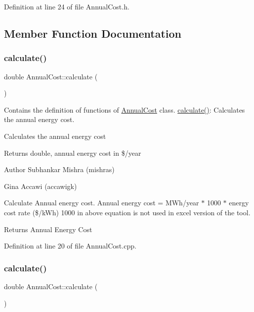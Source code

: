 Definition at line 24 of file Annual\+Cost.\+h.



\subsection{Member Function Documentation}
\mbox{\label{class_annual_cost_adb12b66af50d01746c3f6f0d430b1fdd}} 
\subsubsection{\texorpdfstring{calculate()}{calculate()}\hspace{0.1cm}{\footnotesize\ttfamily [1/3]}}
{\footnotesize\ttfamily double Annual\+Cost\+::calculate (\begin{DoxyParamCaption}{ }\end{DoxyParamCaption})}



Contains the definition of functions of \hyperlink{class_annual_cost}{Annual\+Cost} class. \hyperlink{class_annual_cost_adb12b66af50d01746c3f6f0d430b1fdd}{calculate()}\+: Calculates the annual energy cost. 

Calculates the annual energy cost \begin{DoxyReturn}{Returns}
double, annual energy cost in \$/year
\end{DoxyReturn}
\begin{DoxyAuthor}{Author}
Subhankar Mishra (mishras) 

Gina Accawi (accawigk) 
\end{DoxyAuthor}
Calculate Annual energy cost. Annual energy cost = M\+Wh/year $\ast$ 1000 $\ast$ energy cost rate (\$/k\+Wh) 1000 in above equation is not used in excel version of the tool.

\begin{DoxyReturn}{Returns}
Annual Energy Cost 
\end{DoxyReturn}


Definition at line 20 of file Annual\+Cost.\+cpp.

\mbox{\label{class_annual_cost_adb12b66af50d01746c3f6f0d430b1fdd}} 
\subsubsection{\texorpdfstring{calculate()}{calculate()}\hspace{0.1cm}{\footnotesize\ttfamily [2/3]}}
{\footnotesize\ttfamily double Annual\+Cost\+::calculate (\begin{DoxyParamCaption}{ }\end{DoxyParamCaption})}


